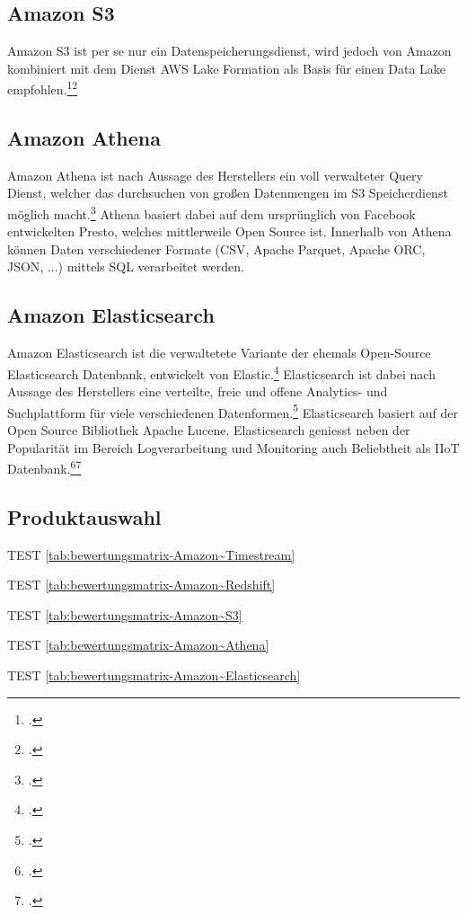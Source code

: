 \subsection{Amazon S3}
Amazon \acf{S3} ist per se nur ein Datenspeicherungsdienst, wird jedoch von Amazon kombiniert mit dem Dienst AWS Lake Formation als Basis für einen Data Lake empfohlen.\footcite[Vgl.][]{AmazonWebServicesInc..o.J.f}\nzitat\footcite[Vgl.][2\psqq]{AmazonWebServicesInc..2017}

\subsection{Amazon Athena}
Amazon Athena ist nach Aussage des Herstellers ein voll verwalteter Query Dienst, welcher das durchsuchen von großen Datenmengen im \ac{S3} Speicherdienst möglich macht.\footcite[Vgl.][]{Barr.2016} Athena basiert dabei auf dem ursprünglich von Facebook entwickelten Presto, welches mittlerweile Open Source ist. Innerhalb von Athena können Daten verschiedener Formate (\ac{CSV}, Apache Parquet, Apache ORC, \ac{JSON}, ...) mittels \ac{SQL} verarbeitet werden.

\subsection{Amazon Elasticsearch}
Amazon Elasticsearch ist die verwaltetete Variante der ehemals Open-Source Elasticsearch Datenbank, entwickelt von Elastic.\footcite[Vgl.][]{Barr.01.10.2015} Elasticsearch ist dabei nach Aussage des Herstellers eine verteilte, freie und offene Analytics- und Suchplattform für viele verschiedenen Datenformen.\footcite[Vgl.][]{ElasticsearchInc..o.J.} Elasticsearch basiert auf der Open Source Bibliothek Apache Lucene. Elasticsearch geniesst neben der Popularität im Bereich Logverarbeitung und Monitoring auch Beliebtheit als \ac{IIoT} Datenbank.\footcite[Vgl.][]{Mantfeld.2019}\nzitat\footcite[Vgl.][]{Bajer.2017}



\subsection{Produktauswahl}
TEST \autoref{tab:bewertungsmatrix-Amazon~Timestream}

TEST \autoref{tab:bewertungsmatrix-Amazon~Redshift}

TEST \autoref{tab:bewertungsmatrix-Amazon~S3}

TEST \autoref{tab:bewertungsmatrix-Amazon~Athena}

TEST \autoref{tab:bewertungsmatrix-Amazon~Elasticsearch}
